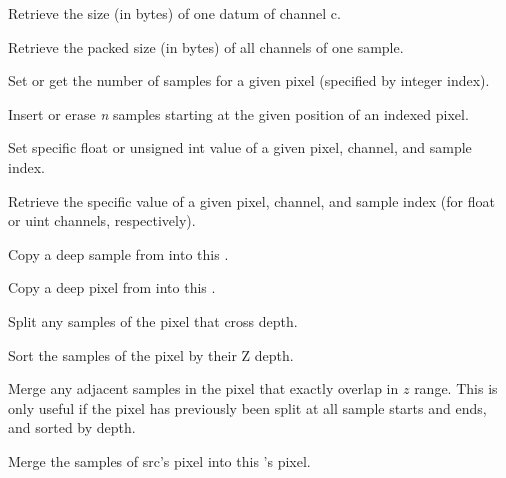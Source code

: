 Retrieve the size (in bytes) of one datum of channel {\cf c}.
\apiend

Retrieve the packed size (in bytes) of all channels of one sample.
\apiend


Set or get the number of samples for a given pixel (specified by integer
index).
\apiend

Insert or erase \emph{n} samples starting at the given position of an
indexed pixel.
\apiend

Set specific float or unsigned int value of a given pixel, channel, and
sample index.
\apiend

Retrieve the specific value of a given pixel,
channel, and sample index (for float or uint channels, respectively).
\apiend

Copy a deep sample from  into this \DeepData.
\apiend

Copy a deep pixel from  into this \DeepData.
\apiend

Split any samples of the pixel that cross {\cf depth}.
\apiend

Sort the samples of the pixel by their Z depth.
\apiend

Merge any adjacent samples in the pixel that exactly overlap in $z$
range. This is only useful if the pixel has previously been split at
all sample starts and ends, and sorted by depth.
\apiend

Merge the samples of {\cf src}'s pixel into this \DeepData's pixel.
\apiend

